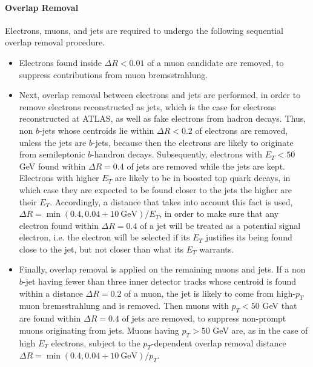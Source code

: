 \paragraph{Overlap Removal} Electrons, muons, and jets are required to undergo
the following sequential overlap removal procedure.

\begin{itemize}

	\item Electrons found inside $\Delta R < 0.01$ of a muon candidate are removed,
	      to suppress contributions from muon bremsstrahlung.

	\item Next, overlap removal between electrons and jets are performed, in order
	      to remove electrons reconstructed as jets, which is the case for electrons
	      reconstructed at ATLAS, as well as fake electrons from hadron decays. Thus, non
	      $b$-jets whose centroids lie within $\Delta R < 0.2$ of electrons are removed,
	      unless the jets are $b$-jets, because then the electrons are likely to
	      originate from semileptonic $b$-handron decays. Subsequently, electrons with
	      $E_T < 50$ GeV found within $\Delta R = 0.4$ of jets are removed while the jets
	      are kept. Electrons with higher $E_T$ are likely to be in boosted top quark
	      decays, in which case they are expected to be found closer to the jets the
	      higher are their $E_T$. Accordingly, a distance that takes into account this
	      fact is used, $\Delta R = \min(0.4, 0.04+10~\text{GeV}) / E_T$, in order to
	      make sure that any electron found within $\Delta R = 0.4$ of a jet will be
	      treated as a potential signal electron, i.e. the electron will be selected if
	      its $E_T$ justifies its being found close to the jet, but not closer than what
	      its $E_T$ warrants.

	\item Finally, overlap removal is applied on the remaining muons and jets. If a
	      non $b$-jet having fewer than three inner detector tracks whose centroid is
	      found within a distance $\Delta R = 0.2$ of a muon, the jet is likely to come
	      from high-$p_T$ muon bremsstrahlung and is removed. Then muons with $p_T < 50$
	      GeV that are found within $\Delta R = 0.4$ of jets are removed, to suppress
	      non-prompt muons originating from jets. Muons having $p_T > 50$ GeV are, as in
	      the case of high $E_T$ electrons, subject to the $p_T$-dependent overlap
	      removal distance $\Delta R = \min(0.4, 0.04+10~\text{GeV}) / p_T$.

\end{itemize}


